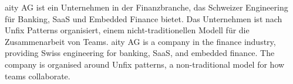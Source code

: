 
{
}


\begin{cvparagraph}
	{
		aity AG ist ein Unternehmen in der Finanzbranche, das Schweizer Engineering für Banking, SaaS und Embedded Finance bietet.\newline
		Das Unternehmen ist nach Unfix Patterns organisiert, einem nicht-traditionellen Modell für die Zusammenarbeit von Teams.
	}
	{
		aity AG is a company in the finance industry, providing Swiss engineering for banking, SaaS, and embedded finance.\newline
		The company is organised around Unfix patterns, a non-traditional model for how teams collaborate.
	}
\end{cvparagraph}

